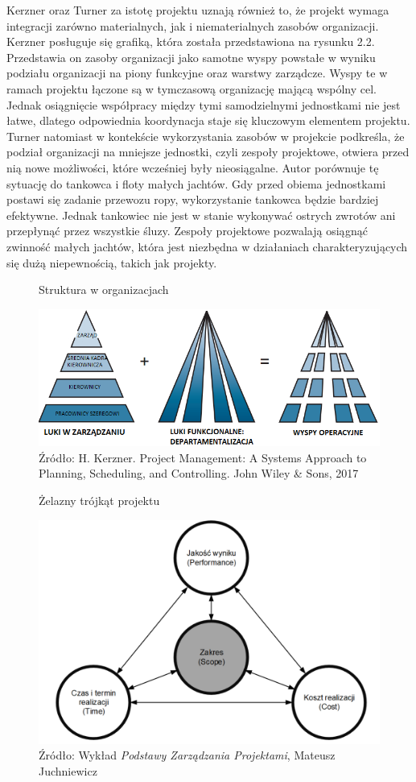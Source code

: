 Kerzner \autocite{Kerzner2017} oraz Turner \autocite{Turner2016} za istotę projektu uznają również to, że projekt wymaga integracji zarówno materialnych, jak i niematerialnych zasobów organizacji. Kerzner posługuje się grafiką, która została przedstawiona na rysunku 2.2. Przedstawia on zasoby organizacji jako samotne wyspy powstałe w wyniku podziału organizacji na piony funkcyjne oraz warstwy zarządcze. Wyspy te w ramach projektu łączone są w tymczasową organizację mającą wspólny cel. Jednak osiągnięcie współpracy między tymi samodzielnymi jednostkami nie jest łatwe, dlatego odpowiednia koordynacja staje się kluczowym elementem projektu. Turner natomiast w kontekście wykorzystania zasobów w projekcie podkreśla, że podział organizacji na mniejsze jednostki, czyli zespoły projektowe, otwiera przed nią nowe możliwości, które wcześniej były nieosiągalne. Autor porównuje tę sytuację do tankowca i floty małych jachtów. Gdy przed obiema jednostkami postawi się zadanie przewozu ropy, wykorzystanie tankowca będzie bardziej efektywne. Jednak tankowiec nie jest w stanie wykonywać ostrych zwrotów ani przepłynąć przez wszystkie śluzy. Zespoły projektowe pozwalają osiągnąć zwinność małych jachtów, która jest niezbędna w działaniach charakteryzujących się dużą niepewnością, takich jak projekty.
\begin{figure}
\centering
\caption{Struktura w organizacjach}
\includegraphics[width=15cm]{img/organizacja_PL.png}
\caption*{Źródło:  H. Kerzner. Project Management: A Systems Approach to Planning, Scheduling, and Controlling. John
Wiley \& Sons, 2017}
\end{figure}
\begin{figure}
\centering
\caption{Żelazny trójkąt projektu}
\includegraphics[width=14cm]{img/projekt2.png}
\caption*{Źródło: Wykład \textit{Podstawy Zarządzania Projektami}, Mateusz Juchniewicz}
\end{figure}

